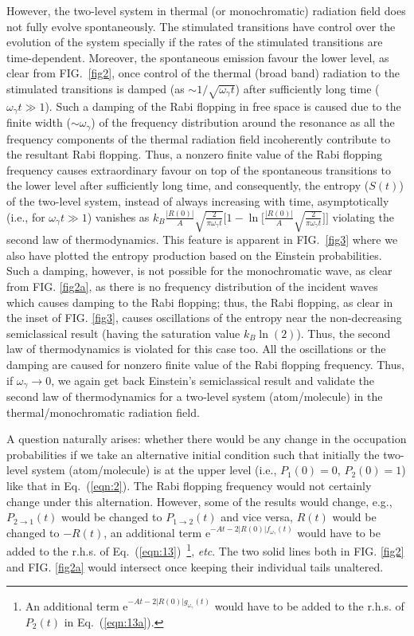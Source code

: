 \documentclass[aps,pra,twocolumn,showpacs,preprintnumbers,amsmath,amssymb,footinbib]{revtex4}
\begin{document}
However, the two-level system in thermal (or monochromatic) radiation field does not fully evolve spontaneously. The stimulated transitions have control over the evolution of the system specially if the rates of the stimulated transitions are time-dependent. Moreover, the spontaneous emission favour the lower level, as clear from FIG.~\ref{fig2}, once control of the thermal (broad band) radiation to the stimulated transitions is damped (as $\sim1/\sqrt{\omega_\gamma t}$) after sufficiently long time ($\omega_\gamma t\gg1$). Such a damping of the Rabi flopping in free space is caused due to the finite width ($\sim\omega_\gamma$) of the frequency distribution around the resonance as all the frequency components of the thermal radiation field incoherently contribute to the resultant Rabi flopping. Thus, a nonzero finite value of the Rabi flopping frequency causes extraordinary favour on top of the spontaneous transitions to the lower level after sufficiently long time, and consequently, the entropy ($S(t)$) of the two-level system, instead of always increasing with time, asymptotically (i.e., for $\omega_\gamma t\gg1$) vanishes as $k_B\frac{|R(0)|}{A}\sqrt{\frac{2}{\pi\omega_\gamma t}}\big[1-\ln\big[\frac{|R(0)|}{A}\sqrt{\frac{2}{\pi\omega_\gamma t}}\big]\big]$ violating the second law of thermodynamics. This feature is apparent in FIG.~\ref{fig3} where we also have plotted the entropy production based on the Einstein probabilities. Such a damping, however, is not possible for the monochromatic wave, as clear from FIG. \ref{fig2a}, as there is no frequency distribution of the incident waves which causes damping to the Rabi flopping; thus, the Rabi flopping, as clear in the inset of FIG. \ref{fig3}, causes oscillations of the entropy near the non-decreasing semiclassical result (having the saturation value $k_B\ln(2)$). Thus, the second law of thermodynamics is violated for this case too. All the oscillations or the damping are caused for nonzero finite value of the Rabi flopping frequency. Thus, if $\omega_\gamma\rightarrow0$, we again get back Einstein's semiclassical result and validate the second law of thermodynamics for a two-level system (atom/molecule) in the thermal/monochromatic radiation field.

A question naturally arises: whether there would be any change in the occupation probabilities if we take an alternative initial condition such that initially the two-level system (atom/molecule) is at the upper level (i.e., $P_{1}(0)=0$, $P_{2}(0)=1$) like that in Eq.~(\ref{eqn:2}). The Rabi flopping frequency would not certainly change under this alternation. However, some of the results would change, e.g., $P_{2\rightarrow1}(t)$ would be changed to $P_{1\rightarrow2}(t)$ and vice versa, $R(t)$ would be changed to $-R(t)$, an additional term $\text{e}^{-At-2|R(0)|f_{\omega_\gamma}(t)}$ would have to be added to the r.h.s. of  Eq.~(\ref{eqn:13})~\footnote{An additional term $\text{e}^{-At-2|R(0)|g_{\omega_\gamma}(t)}$ would have to be added to the r.h.s. of $P_2(t)$ in Eq.~(\ref{eqn:13a}).}, \textit{etc}. The two solid lines both in FIG. \ref{fig2}  and FIG. \ref{fig2a} would intersect once keeping their individual tails unaltered.
\end{document}
